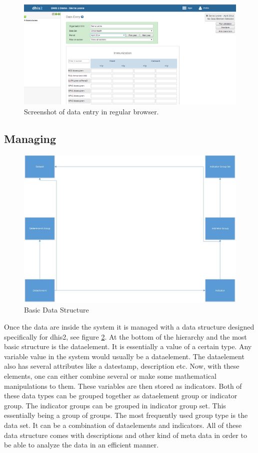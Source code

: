 \begin{figure}
\centering
\includegraphics[width=\columnwidth]{context/img/dhis2DataEntry}
\caption{Screenshot of data entry in regular browser.}
\label{fig:dataentry}
\end{figure}

\subsection{Managing}
\begin{figure}
\centering
\includegraphics[width=\columnwidth]{context/img/dataStructure}
\caption{Basic Data Structure}
\label{fig:structure}
\end{figure}
Once the data are inside the system it is managed with a data structure designed specifically for \gls{dhis2}, see figure \ref{fig:structure}.
At the bottom of the hierarchy and the most basic structure is the dataelement. 
It is essentially a value of a certain type. 
Any variable value in the system would usually be a dataelement. 
The dataelement also has several attributes like a datestamp, description etc. 
Now, with these elements, one can either combine several or make some mathematical manipulations to them. 
These variables are then stored as indicators. 
Both of these data types can be grouped together as dataelement group or indicator group. 
The indicator groups can be grouped in indicator group set. 
This essentially being a group of groups. 
The most frequently used group type is the data set. 
It can be a combination of dataelements and indicators. 
All of these data structure comes with descriptions and other kind of meta data in order to be able to analyze the data in an efficient manner.


